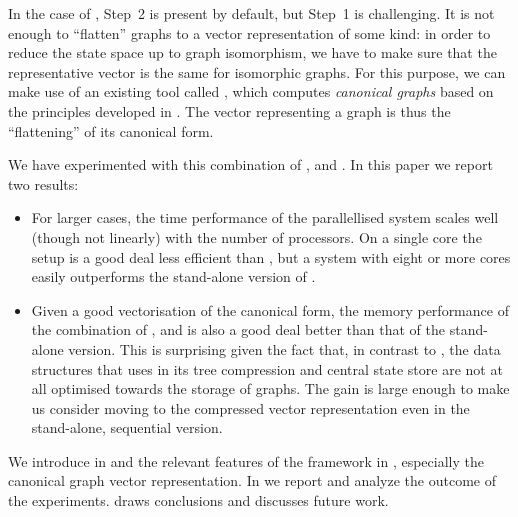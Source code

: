 In the case of \GROOVE, Step~2 is present by default, but Step~1 is
challenging. It is not enough to ``flatten'' graphs to a vector representation
of some kind: in order to reduce the state space up to graph isomorphism, we
have to make sure that the representative vector is the same for isomorphic
graphs. For this purpose, we can make use of an existing tool called \BLISS
\cite{BLISS}, which computes \emph{canonical graphs} based on the principles
developed in \cite{McKay1981}. The \LTSMIN vector representing a graph is thus
the ``flattening'' of its canonical form.

\medskip\noindent We have experimented with this combination of \LTSMIN,
\GROOVE and \BLISS. In this paper we report two results:
\begin{itemize}\noitemsep
\item For larger cases, the time performance of the parallellised system scales
  well (though not linearly) with the number of processors. On a single core
  the setup is a good deal less efficient than \GROOVE, but a system with eight
  or more cores easily outperforms the stand-alone version of \GROOVE.

\item Given a good vectorisation of the canonical form, the memory performance
  of the combination of \LTSMIN, \GROOVE and \BLISS is also a good deal better than 
  that of the stand-alone version.
  This is surprising given the fact that, in contrast to \GROOVE, the data
  structures that \LTSMIN uses in its tree compression and central state store
  are not at all optimised towards the storage of graphs. The gain is large
  enough to make us consider moving to the compressed vector representation
  even in the stand-alone, sequential version.
\end{itemize}
%
We introduce \GROOVE in  and the relevant features of the \LTSMIN
framework in , especially the canonical graph vector
representation. In  we report and analyze the outcome of the
experiments.  draws conclusions and discusses
future work.

